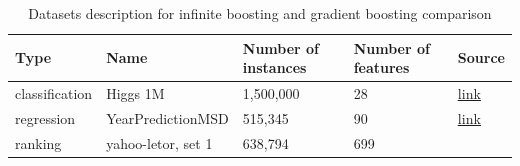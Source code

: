 \begin{table}[!t]
  \caption{Datasets description for infinite boosting and gradient boosting comparison}
  \label{tab:gb-data}
  \centering
  \dospace
  \begin{tabular}{lllll}
    \toprule
    Type     &  Name & Number of instances     & Number of features & Source \\
    \midrule
    classification & Higgs 1M & 1,500,000  & 28   & \href{https://archive.ics.uci.edu/ml/datasets/HIGGS}{\underline{link}}  \\
    regression     & YearPredictionMSD & 515,345 & 90   & \href{https://archive.ics.uci.edu/ml/datasets/YearPredictionMSD}{\underline{link}}   \\
    ranking     & yahoo-letor, set 1 &  638,794   & 699  & \cite{key-yahoo-data} \\
    \bottomrule
  \end{tabular}
\end{table}

